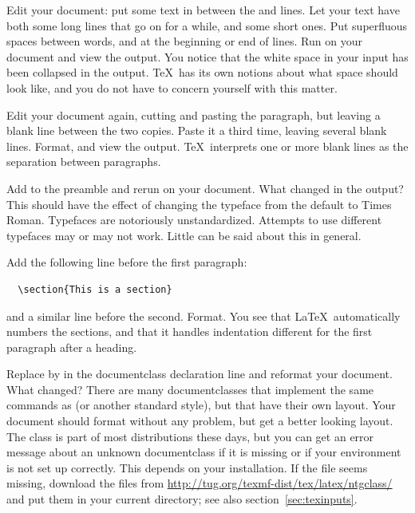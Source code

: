 \practical
{Edit your document: put some text in between the 
 and  lines.
Let your text have both some long lines that go on for a while,
and some short ones. Put superfluous spaces between words, and at the
beginning or end of lines. Run  on your document and view
the output.}
{You notice that the white space in your input has been collapsed in the
  output. \TeX\ has its own notions about what space should look like,
  and you do not have to concern yourself with this matter.}{}

\practical 
{Edit your document again, cutting and pasting the
  paragraph, but leaving a blank line between the two copies. Paste it
  a third time, leaving several blank lines. Format, and view the
  output.}
{\TeX\ interprets one or more blank lines as the
  separation between paragraphs.}{}

\practical
{Add  to the preamble and rerun
   on your
document. What changed in the output?}
{This should have the effect of changing the typeface from the default
  to Times Roman.}
{Typefaces are notoriously unstandardized. Attempts to use different
  typefaces may or may not work. Little can be said about this in general.}

Add the following line before the first paragraph:
\begin{verbatim}
  \section{This is a section}
\end{verbatim}
and a similar line before the
second. Format. You see that \LaTeX\ automatically numbers the
sections, and that it handles indentation different for the first
paragraph after a heading.

\practical
{Replace  by  in the documentclass declaration line and
reformat your document. What changed?}
{There are many documentclasses that implement the same commands as
   (or another standard style), but that have their own
  layout. Your document should format without any problem, but get a
  better looking layout.}
{The  class is part of most distributions these days, but
  you can get an error message about an unknown documentclass if it is
  missing or if your environment is not set up correctly. This depends
  on your installation. If the file seems missing, download the files
  from \url{http://tug.org/texmf-dist/tex/latex/ntgclass/}
  and put them in your current directory; see also section~\ref{sec:texinputs}.}

